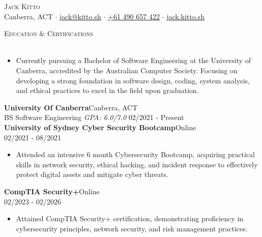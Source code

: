 \documentclass[a4paper]{article}
\newcommand{\lineunder} {
    \vspace*{-8pt} \\
    \hspace*{-18pt} \hrulefill \\
}
\newcommand{\header} [1] {
    {\hspace*{-18pt}\vspace*{6pt} \textsc{#1}}
    \vspace*{-6pt} \lineunder
}
\begin{document}
    \vspace*{-40pt}

\vspace*{-10pt}
\begin{center}
  {\Huge \scshape {Jack Kitto}}\\
  Canberra, ACT $\cdot$ \href{mailto:jack@kitto.sh}{jack@kitto.sh} $\cdot$ \href{tel:+61 490 657 422}{+61 490 657 422} $\cdot$ \url{jack.kitto.sh}\\
\end{center}

      \header{Education \& Certifications}
\begin{itemize} \itemsep 1pt
  \item Currently pursuing a Bachelor of Software Engineering at the University of Canberra, accredited by the Australian Computer Society. Focusing on developing a strong foundation in software design, coding, system analysis, and ethical practices to excel in the field upon graduation.
\end{itemize}

      \textbf{University Of Canberra}\hfill Canberra, ACT\\
BS Software Engineering \textit{GPA: 6.0/7.0} \hfill 02/2021 - Present\\

\vspace{2mm}
      \textbf{University of Sydney Cyber Security Bootcamp}\hfill Online\\
           \hfill 02/2021 - 08/2021\\
          \vspace{-1mm}
\begin{itemize} \itemsep 1pt
  \item Attended an intensive 6 month Cybersecurity Bootcamp, acquiring practical skills in network security, ethical hacking, and incident response to effectively protect digital assets and mitigate cyber threats.
\end{itemize}
          \vspace{2mm}
      \textbf{CompTIA Security+}\hfill Online\\
        \hfill 02/2023 - 02/2026\\
          \vspace{-1mm}
\begin{itemize} \itemsep 1pt
  \item Attained CompTIA Security+ certification, demonstrating proficiency in cybersecurity principles, network security, and risk management practices.
\end{itemize}
          \vspace{2mm}
\end{document}
